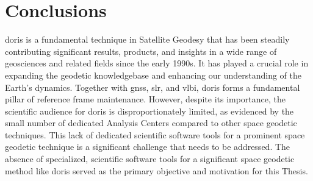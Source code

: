 \section{Conclusions}\label{sec:conclusions}

\iffalse
\gls{doris} is one of the fundamental techniques of Satellite Geodesy, steadily contributing 
since the early 1990s significant results, products and insight in a wide range of geosciences 
and related fields. It has played a crucial role in expanding the geodetic knowledgebase 
and our understanding of the Earth's dynamics. Along with \gls{gnss}, \gls{slr} and 
\gls{vlbi}, it constitutes a fundamental pillar of reference frame maintenance. Yet, 
its scientific audience is dsiproportionally limited, a fact evident by the small number 
of dedicated Analysis Centers compared to the other space geodetic techniques. This 
lack of dedicated, scientific software tools for a prominent space geodetic technique 
such as \gls{doris} was the target and driving force for this Thesis.
\fi
\gls{doris} is a fundamental technique in Satellite Geodesy that has been steadily 
contributing significant results, products, and insights in a wide range of 
geosciences and related fields since the early 1990s. It has played a crucial 
role in expanding the geodetic knowledgebase and enhancing our understanding 
of the Earth's dynamics. Together with \gls{gnss}, \gls{slr}, and \gls{vlbi}, \gls{doris} 
forms a fundamental pillar of reference frame maintenance. However, despite its 
importance, the scientific audience for \gls{doris} is disproportionately 
limited, as evidenced by the small number of dedicated Analysis Centers compared 
to other space geodetic techniques. This lack of dedicated scientific software 
tools for a prominent space geodetic technique is a significant challenge that 
needs to be addressed. The absence of specialized, scientific software tools for 
a significant space geodetic method like \gls{doris} served as the primary 
objective and motivation for this Thesis.

